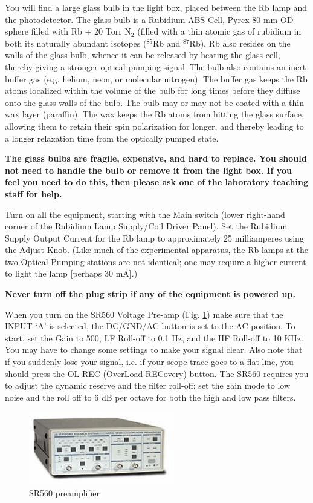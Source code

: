 \documentclass[11pt]{article}
\begin{document}
You will find a large glass bulb in the light box, placed between the Rb lamp and the photodetector. The glass bulb is a Rubidium ABS Cell, Pyrex 80 mm OD sphere filled with Rb + 20 Torr N$_2$ (filled with a thin atomic gas of rubidium in both its naturally abundant isotopes ($^{85}$Rb and $^{87}$Rb). Rb also resides on the walls of the glass bulb, whence it can be released by heating the glass cell, thereby giving a stronger optical pumping signal. The bulb also contains an inert buffer gas (e.g. helium, neon, or molecular nitrogen). The buffer gas keeps the Rb atoms localized within the volume of the bulb for long times before they diffuse onto the glass walls of the bulb. The bulb may or may not be coated with a thin wax layer (paraffin). The wax keeps the Rb atoms from hitting the glass surface, allowing them to retain their spin polarization for longer, and thereby leading to a longer relaxation time from the optically pumped state.

\textbf{The glass bulbs are fragile, expensive, and hard to replace. You should not need to handle the bulb or remove it from the light box. If you feel you need to do this, then please ask one of the laboratory teaching staff for help.}

Turn on all the equipment, starting with the Main switch (lower right-hand corner of the Rubidium Lamp Supply/Coil Driver Panel). Set the Rubidium Supply Output Current for the Rb lamp to approximately 25 milliamperes using the Adjust Knob. (Like much of the experimental apparatus, the Rb lamps at the two Optical Pumping stations are not identical; one may require a higher current to light the lamp [perhaps 30 mA].)

\textbf{Never turn off the plug strip if any of the equipment is powered up.}

When you turn on the SR560 Voltage Pre-amp (Fig. \ref{fig:preamp}) make sure that the INPUT `A' is selected, the DC/GND/AC button is set to the AC position. To start, set the Gain to 500, LF Roll-off to 0.1 Hz, and the HF Roll-off to 10 KHz. You may have to change some settings to make your signal clear. Also note that if you suddenly lose your signal, i.e. if your scope trace goes to a flat-line, you should press the OL REC (OverLoad RECovery) button. The SR560 requires you to adjust the dynamic reserve and the filter roll-off; set the gain mode to low noise and the roll off to 6 dB per octave for both the high and low pass filters. 

\begin{figure}
\centering
\includegraphics{figures/OPTimage002.jpg}
\caption{SR560 preamplifier}
\label{fig:preamp}
\end{figure}
\end{document}
